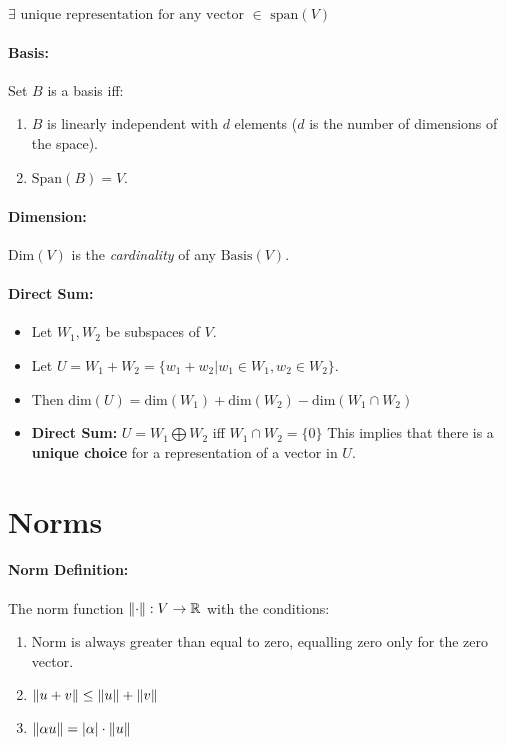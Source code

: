 \documentclass[a4paper,12pt]{report}
\DeclarePairedDelimiter\abs{\lvert}{\rvert}%
\DeclarePairedDelimiter\norm{\lVert}{\rVert}%
\def\reals{\mathbb{R}}
\begin{document}
$\exists \text{ unique representation for any vector } \in \text{ span}(V)$

\paragraph{Basis: } Set $B$ is a basis iff: 
\begin{enumerate}
\item $B$ is linearly independent with $d$ elements ($d$ is the number of dimensions of the space).
\item $\text{Span}(B) = V$.
\end{enumerate}

\paragraph{Dimension: } $\text{Dim}(V)$ is the \textit{cardinality} of any $\text{Basis}(V)$.

\paragraph{Direct Sum: } 
\begin{itemize}
\item Let $W_1, W_2$ be subspaces of $V$.
\item Let $U = W_1 + W_2 = \{w_1 + w_2 | w_1 \in W_1, w_2 \in W_2\}$.
\item Then $\text{dim}(U) = \text{dim}(W_1) + \text{dim}(W_2) - \text{dim}(W_1 \cap W_2)$
\item \textbf{Direct Sum: } $U = W_1 \bigoplus W_2$ iff $W_1 \cap W_2 = \{0\}$
This implies that there is a \textbf{unique choice} for a representation of a vector in $U$.
\end{itemize}

\section{Norms}

\paragraph{Norm Definition: } The norm function $\norm{\cdot}: V\to \reals$ with the conditions:
\begin{enumerate}
\item Norm is always greater than equal to zero, equalling zero only for the zero vector.
\item $\norm{u+v} \leq \norm{u} + \norm{v}$
\item $\norm{\alpha u} = \abs{\alpha} \cdot \norm{u}$
\end{enumerate}
\end{document}
